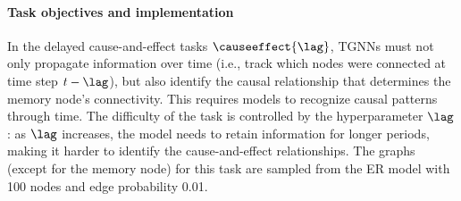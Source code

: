 \paragraph{Task objectives and implementation}
In the delayed cause-and-effect tasks \(\causeeffect{\lag}\), TGNNs must not only propagate information over time (i.e., track which nodes were connected at time step \(t-\lag\)), but also identify the causal relationship that determines the memory node's connectivity. This requires models to recognize causal patterns through time. The difficulty of the task is controlled by the hyperparameter \(\lag\): as \(\lag\) increases, the model needs to retain information for longer periods, making it harder to identify the cause-and-effect relationships. 
The graphs (except for the memory node) for this task are sampled from the ER model with 100 nodes and edge probability 0.01. 



